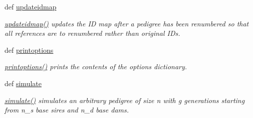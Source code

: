 \begin{DoxyCompactItemize}
def \hyperlink{classPyPedal_1_1pyp__newclasses_1_1NewPedigree_a5f2e95dd43e8bf2b4bfa2907eebd62a1}{updateidmap}
\begin{DoxyCompactList}\small\item\em \hyperlink{classPyPedal_1_1pyp__newclasses_1_1NewPedigree_a5f2e95dd43e8bf2b4bfa2907eebd62a1}{updateidmap()} updates the ID map after a pedigree has been renumbered so that all references are to renumbered rather than original IDs. \item\end{DoxyCompactList}\item 
def \hyperlink{classPyPedal_1_1pyp__newclasses_1_1NewPedigree_ade3f012ba187d2a311e8e85b82167a3f}{printoptions}
\begin{DoxyCompactList}\small\item\em \hyperlink{classPyPedal_1_1pyp__newclasses_1_1NewPedigree_ade3f012ba187d2a311e8e85b82167a3f}{printoptions()} prints the contents of the options dictionary. \item\end{DoxyCompactList}\item 
def \hyperlink{classPyPedal_1_1pyp__newclasses_1_1NewPedigree_a1d239866c3dacb51ad925bbdf9337001}{simulate}
\begin{DoxyCompactList}\small\item\em \hyperlink{classPyPedal_1_1pyp__newclasses_1_1NewPedigree_a1d239866c3dacb51ad925bbdf9337001}{simulate()} simulates an arbitrary pedigree of size n with g generations starting from n\_\-s base sires and n\_\-d base dams. \item\end{DoxyCompactList}\end{DoxyCompactItemize}
